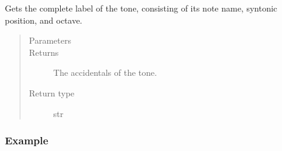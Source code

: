 \documentclass[letterpaper,10pt,english]{sphinxmanual}
\begin{document}
\begin{fulllineitems}
\begin{fulllineitems}
\begin{sphinxVerbatim}[commandchars=\\\{\}]
  
\end{sphinxVerbatim}

\end{fulllineitems}


\begin{fulllineitems}
\label{\detokenize{api:musictheory.Tone.get_label}}
Gets the complete label of the tone, consisting of its note name, syntonic position, and octave.
\begin{quote}\begin{description}
\item[{Parameters}] \leavevmode
{} \textendash{} 

\item[{Returns}] \leavevmode
The accidentals of the tone.

\item[{Return type}] \leavevmode
str

\end{description}\end{quote}
\subsubsection*{Example}

\begin{sphinxVerbatim}[commandchars=\\\{\}]
  
  
 
\end{sphinxVerbatim}


\end{fulllineitems}
\end{fulllineitems}
\end{document}
